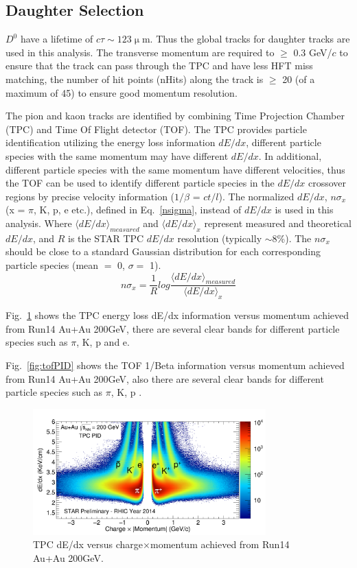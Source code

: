 \documentclass[a4paper]{article}
\begin{document}
\subsection{Daughter Selection}
\label{daughterSelection}
$D^0$ have a lifetime of $c\tau\sim123 \upmu$m. Thus the global tracks for daughter tracks are used in this analysis. The transverse momentum are required to $\geq$ 0.3 GeV/$c$ to ensure that the track can pass through the TPC and have less HFT miss matching, the number of hit points (nHits) along the track is $\geq$ 20 (of a maximum of 45) to ensure good momentum resolution.

The pion and kaon tracks are identified by combining Time Projection Chamber (TPC) and Time Of Flight detector (TOF). The TPC provides particle identification utilizing the energy loss information $dE/dx$, different particle species with the same momentum may have different $dE/dx$. In additional, different particle species with the same momentum have different velocities, thus the TOF can be used to identify different particle species in the $dE/dx$ crossover regions by precise velocity information ($1/\beta$ = $ct/l$). The normalized $dE/dx$, $n\sigma_x$ (x = $\pi$, K, p, e etc.), defined in Eq.~\ref{nsigma}, instead of $dE/dx$ is used in this analysis. Where $\langle{dE/dx}\rangle_{measured}$ and $\langle{dE/dx}\rangle_{x}$ represent measured and theoretical $dE/dx$, and $R$ is the STAR TPC $dE/dx$ resolution (typically $\sim$8\%). The $n\sigma_x$ should be close to a standard Gaussian distribution for each corresponding particle species (mean $=$ 0, $\sigma = $ 1).
\begin{equation}
  n\sigma_x = \frac{1}{R}log\frac{\langle{dE/dx}\rangle_{measured}}{\langle{dE/dx}\rangle_{x}}
\label{nsigma}
\end{equation}

Fig.~\ref{fig:tpcPID} shows the TPC energy loss dE/dx information versus momentum achieved from Run14 Au+Au 200GeV, there are several clear bands for different particle species such as $\pi$, K, p and e. 

Fig.~\ref{fig:tofPID} shows the TOF 1/Beta information versus momentum achieved from Run14 Au+Au 200GeV, also there are several clear bands for different particle species such as $\pi$, K, p . 

\begin{figure}[htbp]
\centering
\includegraphics[keepaspectratio,width=0.8\textwidth]{fig/Run14_AuAu_dEdx_PR_copy.png}
\caption{TPC dE/dx versus charge$\times$momentum achieved from Run14 Au+Au 200GeV.}
 \label{fig:tpcPID}
\end{figure}
\end{document}
